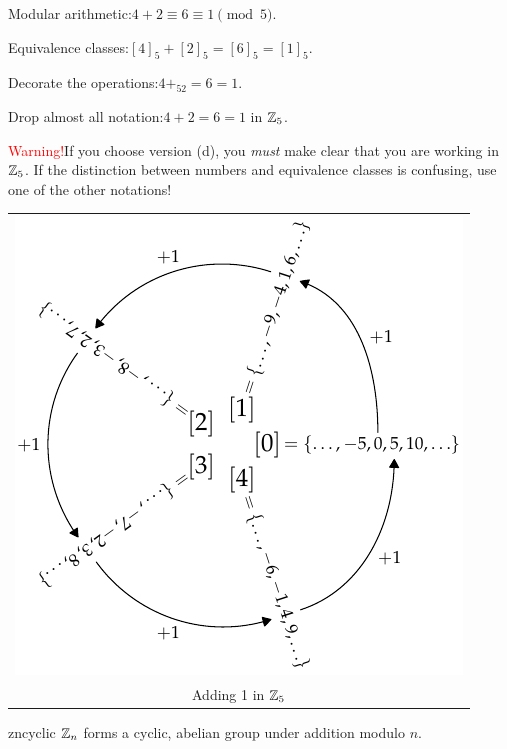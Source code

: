 \begin{minipage}[t]{0.6\linewidth}\vspace{0pt}
\begin{enumeratea}%
  \item Modular arithmetic:\quad $4+2\equiv 6\equiv 1\pmod 5$.
  \item Equivalence classes:\quad $[4]_5+[2]_5=[6]_5=[1]_5$.
  \item Decorate the operations:\quad $4+_52=6=1$.
  \item Drop almost all notation:\quad $4+2=6=1$ in $\mathbb{Z}_5$.
\end{enumeratea}
\textcolor{red}{Warning!}\quad If you choose version (d), you \emph{must} make clear that you are working in $\mathbb{Z}_5$. If the distinction between numbers and equivalence classes is confusing, use one of the other notations!
\end{minipage}\begin{minipage}[t]{0.4\linewidth}\vspace{-20pt}
\flushright\begin{tabular}{@{}c@{}}
\includegraphics[scale=0.75]{cyclic-zn}\\
Adding 1 in $\mathbb{Z}_5$\phantom{bo}
\end{tabular}
\end{minipage}


\begin{thm}{}{zncyclic}
$\mathbb{Z}_n$ forms a cyclic, abelian group under addition modulo $n$.
\end{thm}


